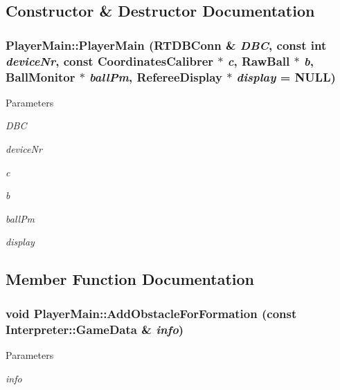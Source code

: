 \subsection{Constructor \& Destructor Documentation}
\hypertarget{classPlayerMain_a12957aeecc6902370f03ff2ffbb0551d}{
\subsubsection[{PlayerMain}]{\setlength{\rightskip}{0pt plus 5cm}PlayerMain::PlayerMain (RTDBConn \& {\em DBC}, \/  const int {\em deviceNr}, \/  const {\bf CoordinatesCalibrer} $\ast$ {\em c}, \/  RawBall $\ast$ {\em b}, \/  {\bf BallMonitor} $\ast$ {\em ballPm}, \/  {\bf RefereeDisplay} $\ast$ {\em display} = {\ttfamily NULL})}}
\label{classPlayerMain_a12957aeecc6902370f03ff2ffbb0551d}

\begin{DoxyParams}{Parameters}
\item[{\em DBC}]\item[{\em deviceNr}]\item[{\em c}]\item[{\em b}]\item[{\em ballPm}]\item[{\em display}]\end{DoxyParams}


\subsection{Member Function Documentation}
\hypertarget{classPlayerMain_a978b3ce16f5d8e5d1cb9ef70f387227e}{
\subsubsection[{AddObstacleForFormation}]{\setlength{\rightskip}{0pt plus 5cm}void PlayerMain::AddObstacleForFormation (const {\bf Interpreter::GameData} \& {\em info})}}
\label{classPlayerMain_a978b3ce16f5d8e5d1cb9ef70f387227e}

\begin{DoxyParams}{Parameters}
\item[{\em info}]\end{DoxyParams}


